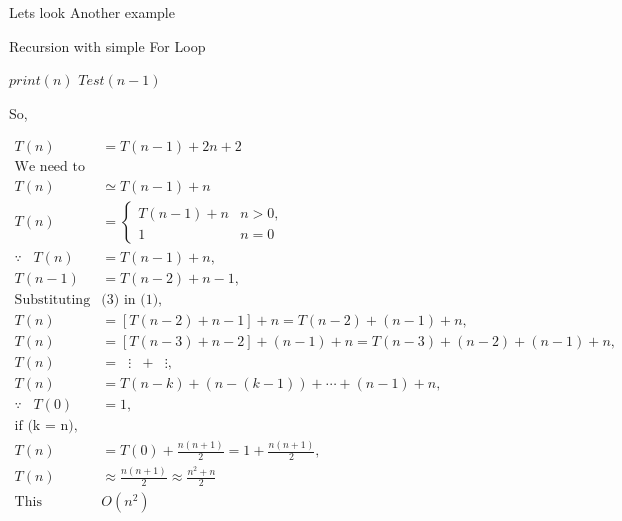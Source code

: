 \documentclass[]{article}
\begin{document}
Lets look Another example
\begin{algorithm}[H]
    \caption{Recursion with simple For Loop}
    \label{printRecursion}
    \begin{algorithmic}
         
             
                \State$print(n)$ 
            \EndFor
            \State$Test(n-1)$  
        \EndIf
        \EndProcedure
    \end{algorithmic}
\end{algorithm}

So,

\[
\begin{aligned}
    T(n) &= T(n - 1) + 2n + 2\\
    \text{We need to take Asymptotic Notation}\\
    T(n) &\simeq  T(n - 1) + n\\
    T(n) &=
    \begin{cases}
        T(n - 1) + n \label{base} & n > 0, \\
        1 & n = 0
    \end{cases} \\
    \because \hspace{10pt} T(n) &= T(n - 1) + n, \\
    T(n - 1) &= T(n - 2) + n - 1, \\
    \text{Substituting} & \text{(3) in (1)}, \\
    T(n) &= [T(n - 2) + n - 1] + n = T(n - 2) + (n-1) + n, \\
    T(n) &= [T(n - 3) + n - 2] + (n-1) + n = T(n - 3) + (n-2) + (n-1) + n, \\
    T(n) &= \hspace{7pt}\vdots \hspace{7pt}+\hspace{7pt} \vdots, \\
    T(n) &= T(n - k) + (n-(k - 1 )) + \cdots + (n-1) + n, \\
    \because \hspace{10pt} T(0) &= 1, \\
    \text{if (k = n)}, \\
    T(n) &= T(0) + \frac{n(n+1)}{2} = 1 + \frac{n(n+1)}{2}, \\
    T(n) &\approx \frac{n(n+1)}{2}  \approx \frac{n^2+n}{2}\\
    \text{This algorithm is } & O(n^2)
\end{aligned}
\]
\end{document}
